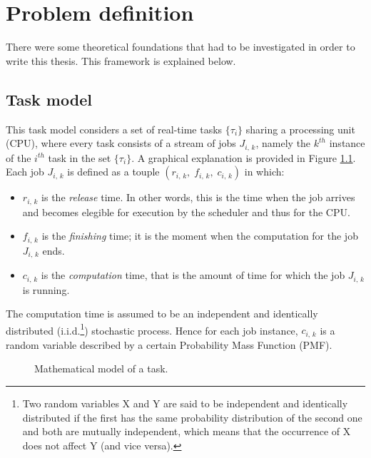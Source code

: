 \chapter{Problem definition}\label{chp:model}


There were some theoretical foundations that had to be investigated in order to write this thesis. This framework is explained below. 

\section{Task model}
This task model considers a set of real-time tasks \( \{\tau_{i}\} \) sharing a processing unit (CPU), where every task consists of a stream of jobs \( J_{i,\,k} \), namely the \( k^{th} \) instance of the \( i^{th} \) task in the set \( \{\tau_{i}\} \). A graphical explanation is provided in Figure \ref{taskmodel}.\\
Each job \( J_{i,\,k} \) is defined as a touple \( \left(r_{i,\,k}, \;f_{i,\,k}, \;c_{i,\,k}\right) \) in which:
\begin{itemize}
  \item \( r_{i,\,k} \) is the \emph{release} time. In other words, this is the time when the job arrives and becomes elegible for execution by the scheduler and thus for the CPU.
  \item \( f_{i,\,k} \) is the \emph{finishing} time; it is the moment when the computation for the job \( J_{i,\,k} \) ends.
  \item \( c_{i,\,k} \) is the \emph{computation} time, that is the amount of time for which the job \( J_{i,\,k} \) is running.
\end{itemize} 

The computation time is assumed to be an independent and identically distributed (i.i.d.\footnote{Two random variables X and Y are said to be independent and identically distributed if the first has the same probability distribution of the second one and both are mutually independent, which means that the occurrence of X does not affect Y (and vice versa).}) stochastic process. Hence for each job instance, \( c_{i,\,k} \) is a random variable described by a certain Probability Mass Function (PMF).
\begin{figure}[H]
  \caption{Mathematical model of a task.}
  \label{taskmodel}
\end{figure}

